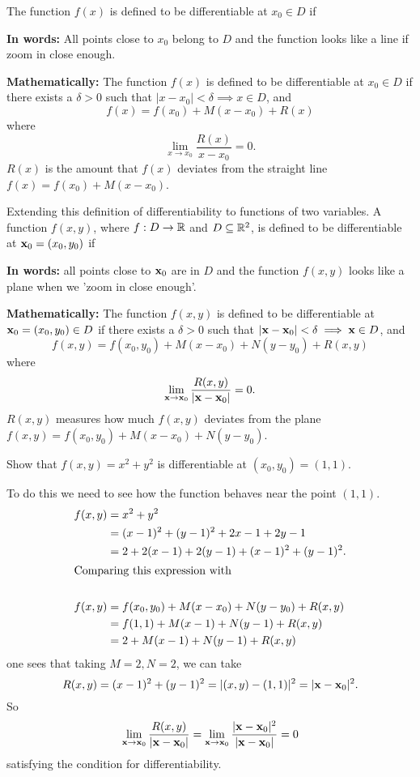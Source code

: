 \documentclass[10pt, a4paper]{article}
\begin{document}
The function $f(x)$ is defined to be differentiable at $x_0 \in D$ if

\textbf{In words:}
All points close to $x_0$ belong to $D$ and the function looks like a line if  zoom in close enough.

\textbf{Mathematically:}
The function $f(x)$ is defined to be differentiable at $x_0 \in D$ if there exists a $\delta > 0$ such that $|x - x_0| < \delta \implies x \in D$,
and
\[
f(x) = f(x_0) + M(x - x_0) + R(x)
\]
where
\[
\lim_{x \rightarrow x_0}\frac{R(x)}{x - x_0} = 0.
\]
$R(x)$ is the amount that $f(x)$ deviates from the straight line $f(x) = f(x_0) + M(x - x_0)$.


Extending this definition of differentiability to functions of two variables.
A function $f(x, y)$,
where $f : D \rightarrow \mathbb{R}$ and $D \subseteq \mathbb{R} ^ 2$,
is defined to be differentiable at $\mathbf{x}_0 = (x_0, y_0)$ if

\textbf{In words:}
all points close to $\mathbf{x}_0$ are in $D$ and the function $f(x, y)$ looks like a plane when we 'zoom in close enough'.

\textbf{Mathematically:}
The function $f(x, y)$ is defined to be differentiable at $\mathbf{x}_0 = (x_0, y_0) \in D$ if there exists a $\delta > 0$ such that $|\mathbf{x} - \mathbf{x}_0| < \delta \implies \mathbf{x} \in D$,
and
\[
f(x, y) = f(x_0, y_0) + M(x - x_0) + N(y - y_0) + R(x, y)
\]
where
\[
\lim_{\mathbf{x} \rightarrow \mathbf{x}_0}\frac{R(x, y)}{|\mathbf{x} - \mathbf{x}_0|} = 0.
\]
$R(x, y)$ measures how much $f(x, y)$ deviates from the plane $f(x, y) = f(x_0, y_0) + M(x - x_0) + N(y - y_0)$.

\begin{example}
    Show that $f(x, y) = x ^ 2 + y ^ 2$ is differentiable at $(x_0, y_0) = (1, 1)$.
    \begin{solution}
        To do this we need to see how the function behaves near the point $(1, 1)$.
        \begin{align*}
            f(x, y) &= x ^ 2 + y ^ 2 \\
            &= (x - 1) ^ 2 + (y - 1) ^ 2 + 2x - 1 + 2y - 1 \\
            &= 2 + 2(x - 1) + 2(y - 1) + (x - 1) ^ 2 + (y - 1) ^ 2. \\
        \intertext{Comparing this expression with} \\
            f(x, y) &= f(x_0, y_0) + M(x - x_0) + N(y - y_0) + R(x, y) \\
            &= f(1, 1) + M(x - 1) + N(y - 1) + R(x, y) \\
            &= 2 + M(x - 1) + N(y - 1) + R(x, y)
        \end{align*}
        one sees that taking $M = 2, N = 2$,
        we can take
        \[
        R(x, y) = (x - 1) ^ 2 + (y - 1) ^ 2 = |(x, y) - (1, 1)| ^ 2 = |\mathbf{x} - \mathbf{x}_0| ^ 2.
        \]
        So
        \[
        \lim_{\mathbf{x} \rightarrow \mathbf{x}_0}\frac{R(x, y)}{|\mathbf{x} - \mathbf{x}_0|} = \lim_{\mathbf{x} \rightarrow \mathbf{x}_0}\frac{|\mathbf{x} - \mathbf{x}_0| ^ 2}{|\mathbf{x} - \mathbf{x}_0|} = 0
        \]
        satisfying the condition for differentiability.
    \end{solution}
\end{example}
\end{document}
